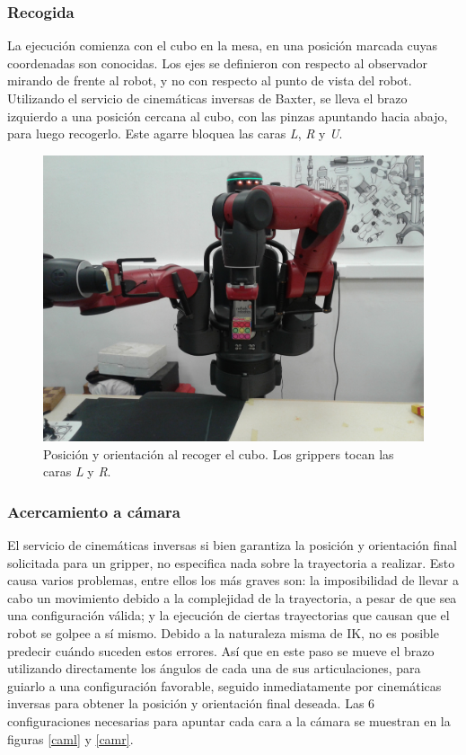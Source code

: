 \subsubsection{Recogida}
La ejecución comienza con el cubo en la mesa, en una posición marcada cuyas coordenadas son conocidas. Los ejes se definieron con respecto al observador mirando de frente al robot, y no con respecto al punto de vista del robot. Utilizando el servicio de cinemáticas inversas de Baxter, se lleva el brazo izquierdo a una posición cercana al cubo, con las pinzas apuntando hacia abajo, para luego recogerlo. Este agarre bloquea las caras \textit{L}, \textit{R} y \textit{U}.

\begin{figure}[h!]
	\centering
	\includegraphics[scale=0.1]{figures/pick}
	\caption[Posición y orientación al recoger el cubo.]{Posición y orientación al recoger el cubo. Los grippers tocan las caras \textit{L} y \textit{R}.}
	\label{pick}
\end{figure}

\subsubsection{Acercamiento a cámara}
El servicio de cinemáticas inversas si bien garantiza la posición y orientación final solicitada para un gripper, no especifica nada sobre la trayectoria a realizar. Esto causa varios problemas, entre ellos los más graves son: la imposibilidad de llevar a cabo un movimiento debido a la complejidad de la trayectoria, a pesar de que sea una configuración válida; y la ejecución de ciertas trayectorias que causan que el robot se golpee a sí mismo. Debido a la naturaleza misma de IK, no es posible predecir cuándo suceden estos errores. Así que en este paso se mueve el brazo utilizando directamente los ángulos de cada una de sus articulaciones, para guiarlo a una configuración favorable, seguido inmediatamente por cinemáticas inversas para obtener la posición y orientación final deseada. Las $6$ configuraciones necesarias para apuntar cada cara a la cámara se muestran en la figuras \ref{caml} y \ref{camr}.

